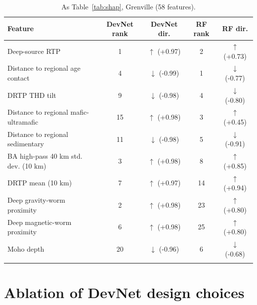 \documentclass[pdflatex,sn-apa]{sn-jnl}
\begin{document}
\begin{appendices}
\begin{table}[!h]
\caption{As Table~\ref{tab:shap}, Grenville (58 features).}\label{tab:shap-gren}
\footnotesize
\begin{tabular*}{\textwidth}{@{\extracolsep\fill}lcccc}
\toprule
Feature & DevNet rank & DevNet dir. & RF rank & RF dir. \\
\midrule
Deep-source RTP & 1 & $\uparrow$ (+0.97) & 2 & $\uparrow$ (+0.73) \\
Distance to regional age contact & 4 & $\downarrow$ (-0.99) & 1 & $\downarrow$ (-0.77) \\
DRTP THD tilt & 9 & $\downarrow$ (-0.98) & 4 & $\downarrow$ (-0.80) \\
Distance to regional mafic-ultramafic & 15 & $\uparrow$ (+0.98) & 3 & $\uparrow$ (+0.45) \\
Distance to regional sedimentary & 11 & $\downarrow$ (-0.98) & 5 & $\downarrow$ (-0.91) \\
BA high-pass 40 km std. dev. (10 km) & 3 & $\uparrow$ (+0.98) & 8 & $\uparrow$ (+0.85) \\
DRTP mean (10 km) & 7 & $\uparrow$ (+0.97) & 14 & $\uparrow$ (+0.94) \\
Deep gravity-worm proximity & 2 & $\uparrow$ (+0.98) & 23 & $\uparrow$ (+0.80) \\
Deep magnetic-worm proximity & 6 & $\uparrow$ (+0.98) & 25 & $\uparrow$ (+0.80) \\
Moho depth & 20 & $\downarrow$ (-0.96) & 6 & $\downarrow$ (-0.68) \\
\botrule
\end{tabular*}
\end{table}

\clearpage
\section{Ablation of DevNet design choices}\label{app:sensitivity}


\end{appendices}
\end{document}
